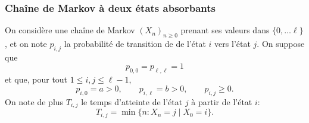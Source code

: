 \subsubsection{Chaîne de Markov à deux états absorbants}

On considère une chaîne de Markov $(X_n)_{n \geq 0}$ prenant ses valeurs dans $\{0, \dots \ell\}$, et on note $p_{i, j}$ la probabilité de transition de de l'état $i$ vers l'état $j$. On suppose que 
$$
p_{0, 0} = p_{\ell, \ell} = 1 
$$
et que, pour tout $1 \leq i, j \leq \ell-1$, 
$$
p_{i, 0} = a > 0, \qquad p_{i, \ell} = b > 0, \qquad p_{i, j} \geq 0.
$$
On note de plus $T_{i, j}$ le temps d'atteinte de l'état $j$ à partir de l'état $i$:
$$
T_{i, j} = \min\{n: X_n = j \mid X_0 = i\}.
$$

